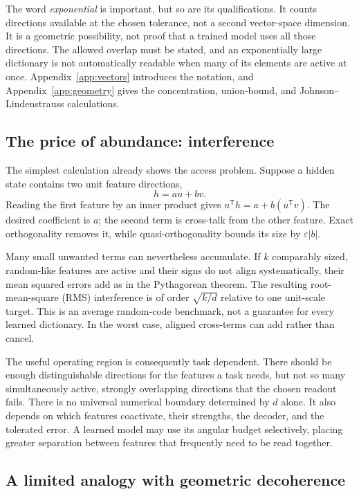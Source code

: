 \documentclass[
  aps,
  reprint,
  superscriptaddress,
  floatfix,
  nofootinbib,
  longbibliography
]{revtex4-2}
\newcommand{\T}{^{\mathsf T}}
\begin{document}
The word \emph{exponential} is important, but so are its qualifications.  It
counts directions available at the chosen tolerance, not a second
vector-space dimension.  It is a geometric possibility, not proof that a
trained model uses all those directions.  The allowed overlap must be stated,
and an exponentially large dictionary is not automatically readable when
many of its elements are active at once.  Appendix~\ref{app:vectors}
introduces the notation, and Appendix~\ref{app:geometry} gives the
concentration, union-bound, and Johnson--Lindenstrauss calculations.

\subsection{The price of abundance: interference}

The simplest calculation already shows the access problem.  Suppose a hidden
state contains two unit feature directions,
\begin{equation}
 h=a u+b v.
 \label{eq:two-feature-main}
\end{equation}
Reading the first feature by an inner product gives
$u\T h=a+b(u\T v)$.  The desired coefficient is $a$; the second term is
cross-talk from the other feature.  Exact orthogonality removes it, while
quasi-orthogonality bounds its size by $\varepsilon|b|$.

Many small unwanted terms can nevertheless accumulate.  If $k$ comparably
sized, random-like features are active and their signs do not align
systematically, their mean squared errors add as in the Pythagorean theorem.
The resulting root-mean-square (RMS) interference is of order
$\sqrt{k/d}$ relative to one unit-scale target.  This is an average random-code
benchmark, not a guarantee for every learned dictionary.  In the worst case,
aligned cross-terms can add rather than cancel.

The useful operating region is consequently task dependent.  There should be
enough distinguishable directions for the features a task needs, but not so
many simultaneously active, strongly overlapping directions that the chosen
readout fails.  There is no universal numerical boundary determined by $d$
alone.  It also depends on which features coactivate, their strengths, the
decoder, and the tolerated error.  A learned model may use its angular budget
selectively, placing greater separation between features that frequently need
to be read together.

\subsection{A limited analogy with geometric decoherence}
\end{document}
